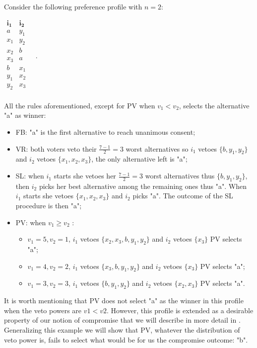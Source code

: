 \begin{example}
	\label{ex:CompromiseEQ2}
	Consider the following preference profile with $n=2$:
	\begin{center}
		$
		\begin{array}{cc}
			\mathbf{i_1} & \mathbf{i_2} \\
			a	&	y_1	\\
			x_1	&	y_2	\\
			x_2	&	b \\
			x_3	&	a \\
			b	&	x_1	\\
			y_1	&	x_2	\\
			y_2	&	x_3	\\
		\end{array} \quad.
		$
	\end{center}
	All the rules aforementioned, except for \acs{PV} when $v_1 < v_2$, selects the alternative "a" as winner:
	\begin{itemize}
		\itemsep0em
		\item[] \acs{FB}: "a" is the first alternative to reach unanimous consent;
		\item[] \acs{VR}: both voters veto their $\frac{7-1}{2}=3$ worst alternatives so $i_1$ vetoes $\{b,y_1,y_2\}$ and $i_2$ vetoes $\{x_1,x_2,x_3\}$, the only alternative left is "a";
		\item[] \acs{SL}: when $i_1$ starts she vetoes her $\frac{7-1}{2}=3$ worst alternatives thus $\{b,y_1,y_2\}$, then $i_2$ picks her best alternative among the remaining ones thus "a". When $i_1$ starts she vetoes $\{x_1,x_2,x_3\}$ and $i_2$ picks "a". The outcome of the \acs{SL} procedure is then "a";
		\item[] \acs{PV}: when $v_1\geq v_2$ :
		\begin{itemize}
			\item $v_1=5, v_2=1$, $i_1$ vetoes $\{x_2,x_3,b,y_1,y_2\}$ and $i_2$ vetoes $\{x_3\}$ \acs{PV} selects "a";
			\item $v_1=4, v_2=2$, $i_1$ vetoes $\{x_3,b,y_1,y_2\}$ and $i_2$ vetoes $\{x_3\}$ \acs{PV} selects "a";
			\item $v_1=3, v_2=3$, $i_1$ vetoes $\{b,y_1,y_2\}$ and $i_2$ vetoes $\{x_2,x_3\}$ \acs{PV} selects "a".
		\end{itemize}
	\end{itemize}	
\end{example}
It is worth mentioning that \acs{PV} does not select "a" as the winner in this profile when the veto powers are $v1<v2$. However, this profile is extended as a desirable property of our notion of compromise that we will describe in more detail in . Generalizing this example we will show that \acs{PV}, whatever the distribution of veto power is, fails to select what would be for us the compromise outcome: "b".


